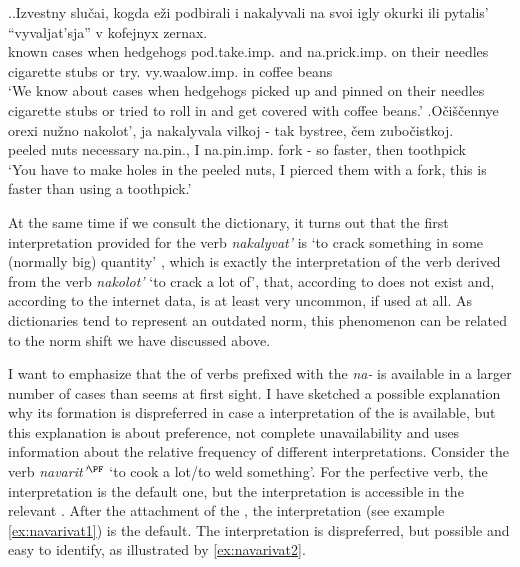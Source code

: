 \ex.\label{ex:nakalyvat}\ag.Izvestny slu\v{c}ai, kogda e\v{z}i podbirali i nakalyvali na svoi igly okurki ili pytalis' ``vyvaljat'sja'' v kofejnyx zernax.\\
known cases when hedgehogs pod.take.imp. and na.prick.imp. on their needles {cigarette stubs} or try. vy.waalow.imp. in coffee beans\\
\trans `We know about cases when hedgehogs picked up and pinned on their needles cigarette stubs or tried to roll in and get covered with coffee beans.'
\bg.O\v{c}i\v{s}\v{c}ennye orexi nu\v{z}no nakolot', ja nakalyvala vilkoj - tak bystree, \v{c}em zubo\v{c}istkoj.\\
peeled nuts necessary na.pin., I na.pin.imp. fork - so faster, then toothpick\\
\trans `You have to make holes in the peeled nuts, I pierced them with a fork, this is faster than using a toothpick.'\\

At the same time if we consult the dictionary, it turns out that the first interpretation provided for the verb \textit{nakalyvat'} is `to crack something in some (normally big) quantity' \citep{Efremova:00}, which is exactly the interpretation of the  verb derived from the verb \textit{nakolot'} `to crack a lot of', that, according to \citet{Svenonius:04b} does not exist and, according to the internet data, is at least very uncommon, if used at all. As dictionaries tend to represent an outdated norm, this phenomenon can be related to the norm shift we have discussed above.

I want to emphasize that the  of verbs prefixed with the  \textit{na-} is available in a larger number of cases than seems at first sight. I have sketched a possible explanation why its formation is dispreferred in case a  interpretation of the  is available, but this explanation is about preference, not complete unavailability and uses information about the relative frequency of different interpretations. Consider the verb \textit{navarit'}$^{\PF}$ `to cook a lot/to weld something'. For the perfective verb, the  interpretation is the default one, but the  interpretation is accessible in the relevant . After the attachment of the , the  interpretation (see example \ref{ex:navarivat1}) is the default. The  interpretation is dispreferred, but possible and easy to identify, as illustrated by \ref{ex:navarivat2}.

